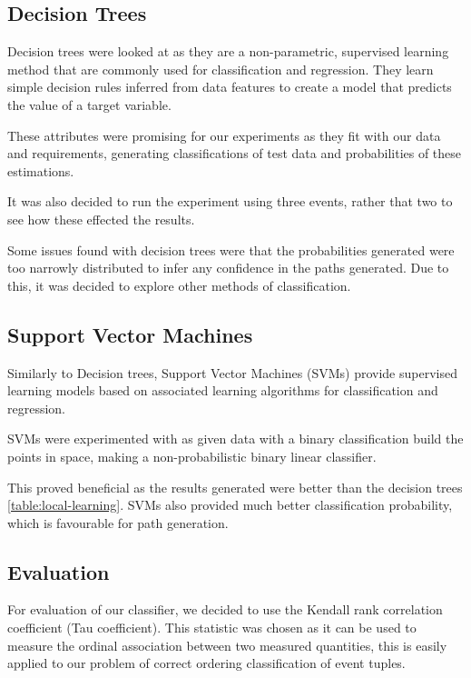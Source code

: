 \documentclass[12pt]{report}
\begin{document}
\subsection{Decision Trees}
Decision trees were looked at as they are a non-parametric, supervised learning method
that are commonly used for classification and regression. They learn simple decision rules inferred from
data features to create a model that predicts the value of a target variable.

These attributes were promising for our experiments as they fit with our data and requirements, generating
classifications of test data and probabilities of these estimations.

It was also decided to run the experiment using three events, rather that two to see how these
effected the results. 

Some issues found with decision trees were that the probabilities generated were too narrowly distributed
to infer any confidence in the paths generated. Due to this, it was decided to explore other methods of
classification.
\vspace{4em}
\subsection{Support Vector Machines}
Similarly to Decision trees, Support Vector Machines (SVMs) provide supervised learning models based on
associated learning algorithms for classification and regression.

SVMs were experimented with as given data with a binary classification build the points in space,
making a non-probabilistic binary linear classifier.

This proved beneficial as the results generated were better than the decision trees \ref{table:local-learning}.
SVMs also provided much better classification probability, which is favourable for path generation.
\vspace{4em}
\subsection{Evaluation}
For evaluation of our classifier, we decided to use the Kendall rank correlation coefficient (Tau coefficient).
This statistic was chosen as it can be used to measure the ordinal association between two measured quantities,
this is easily applied to our problem of correct ordering classification of event tuples.\\ 
\end{document}
